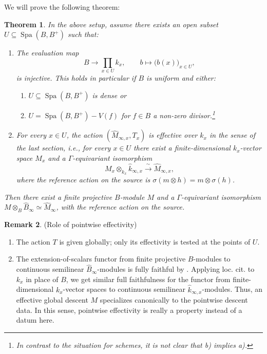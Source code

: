 \documentclass[10pt,twoside]{article}
\numberwithin{equation}{section}
\theoremstyle{plain}
\newtheorem{mythm}{Theorem}[section]
\theoremstyle{definition}
\newtheorem{myrem}[mythm]{Remark}
\DeclareMathOperator{\Spa}{Spa}
\begin{document}
We will prove the following theorem:

\begin{mythm}\label{SenDescent}
    In the above setup, assume there exists an open subset \(U\subseteq \Spa(B,B^+)\) such that:
    \begin{enumerate}
        \item The evaluation map
        \[
        B\longrightarrow\prod_{x\in U}k_x,
        \qquad b\longmapsto\bigl(b(x)\bigr)_{x\in U},
        \]
        is injective. This holds in particular if \(B\) is uniform and either:
        \begin{enumerate}
            \item \(U\subseteq \Spa(B,B^+)\) is dense or
            \item \(U=\Spa(B,B^+)-V(f)\) for \(f\in B\) a non-zero divisor.\footnote{In contrast to the situation for schemes, it is not clear that b) implies a).}
        \end{enumerate}
        \item For every \(x\in U\), the action \((\hat M_{\infty,x},T_x)\) is effective over \(k_x\) in the sense of the last section, i.e., for every \(x\in U\) there exist a finite-dimensional \(k_x\)-vector space \(M_x\) and a \(\Gamma\)-equivariant isomorphism
        \[
        M_x\otimes_{k_x}\hat k_{\infty, x}\xrightarrow{\ \sim\ }\hat M_{\infty,x},
        \]
        where the reference action on the source is \(\sigma(m\otimes h)=m\otimes\sigma(h)\).
    \end{enumerate}
    Then there exist a finite projective \(B\)-module \(M\) and a \(\Gamma\)-equivariant isomorphism \(M\otimes_B\hat B_\infty\simeq\hat M_\infty\), with the reference action on the source.
\end{mythm}

\begin{myrem}(Role of pointwise effectivity)
\begin{enumerate}
    \item The action \(T\) is given globally; only its effectivity is tested at the points of \(U\).
    \item The extension-of-scalars functor from finite projective \(B\)-modules to continuous semilinear \(\hat B_\infty\)-modules is fully faithful by . Applying loc. cit. to \(k_x\) in place of \(B\), we get similar full faithfulness for the functor from finite-dimensional \(k_x\)-vector spaces to continuous semilinear \(\hat k_{\infty, x}\)-modules. Thus, an effective global descent \(M\) specializes canonically to the pointwise descent data. In this sense, pointwise effectivity is really a property instead of a datum here.
\end{enumerate}
\end{myrem}
\end{document}

